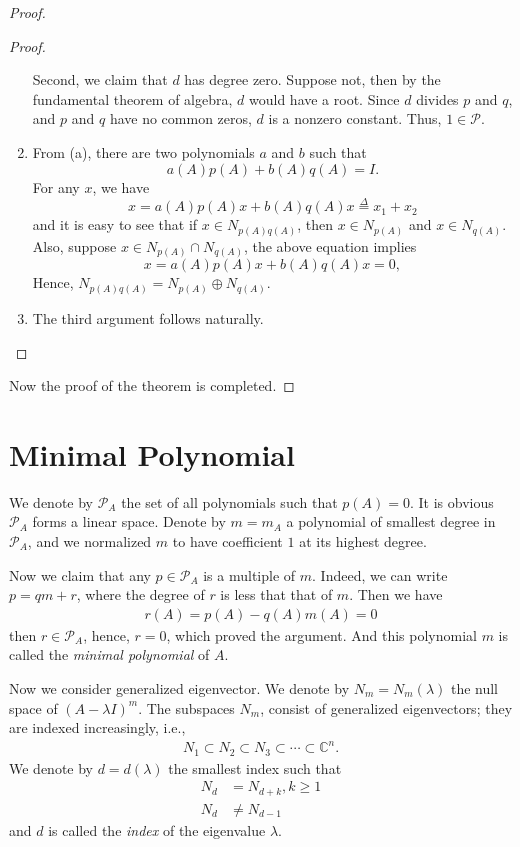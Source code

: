 \documentclass[11pt]{book}
\theoremstyle{definition}
\numberwithin{equation}{chapter}
\begin{document}
\begin{proof}
\begin{proof}
\begin{enumerate}[label=(\alph*)]
    Second, we claim that $d$ has degree zero. Suppose not, then by the fundamental theorem of algebra, $d$ would have a root. Since $d$ divides $p$ and $q$, and $p$ and $q$ have no common zeros, $d$ is a nonzero constant. Thus, $1\in \mathcal{P}$.
    \item From (a), there are two polynomials $a$ and $b$ such that 
    $$a(A)p(A) + b(A)q(A) = I.$$
    For any $x$, we have
    $$x = a(A)p(A)x + b(A)q(A)x \overset{\Delta}{=} x_1 + x_2 $$
    and it is easy to see that if $x\in N_{p(A)q(A)}$, then $x\in N_{p(A)}$ and $x\in N_{q(A)}$. Also, suppose $x\in N_{p(A)}\cap N_{q(A)}$, the above equation implies 
    $$x = a(A)p(A)x + b(A)q(A)x = 0,$$
    Hence, $N_{p(A)q(A)} = N_{p(A)} \oplus N_{q(A)}$.
    \item The third argument follows naturally.
\end{enumerate}
\end{proof}
Now the proof of the theorem is completed.
\end{proof}

\medskip

\section{Minimal Polynomial}

We denote by $\mathcal{P}_A$ the set of all polynomials such that $p(A) = 0$. It is obvious $\mathcal{P}_A$ forms a linear space. Denote by $m = m_A$ a polynomial of smallest degree in $\mathcal{P}_A$, and we normalized $m$ to have coefficient $1$ at its highest degree. 

Now we claim that any $p\in\mathcal{P}_A$ is a multiple of $m$. Indeed, we can write $p = qm +r$, where the degree of $r$ is less that that of $m$. Then we have 
\begin{align*}
    r(A) = p(A) - q(A)m(A) = 0
\end{align*}
then $r\in\mathcal{P}_A$, hence, $r = 0$, which proved the argument. And this polynomial $m$ is called the \emph{minimal polynomial} of $A$.

Now we consider generalized eigenvector. We denote by $N_m = N_m(\lambda)$ the null space of $(A - \lambda I)^m$. The subspaces
$N_m$, consist of generalized eigenvectors; they are indexed increasingly, i.e.,
\begin{align*}
    N_1\subset N_2 \subset N_3 \subset \cdots \subset \mathbb{C}^n.
\end{align*}
We denote by $d = d(\lambda)$ the smallest index such that
\begin{align*}
    N_d & = N_{d+k}, k\geq 1 \\
    N_d & \neq N_{d-1}
\end{align*}
and $d$ is called the \emph{index} of the eigenvalue $\lambda$.
\end{document}
